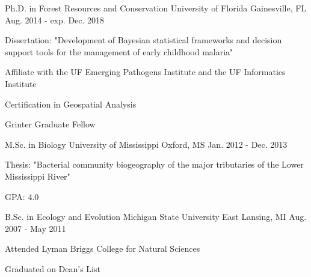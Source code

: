 

\begin{cventries}

  \cventry
    {Ph.D. in Forest Resources and Conservation} %
    {University of Florida} %
    {Gainesville, FL} %
    {Aug. 2014 - exp. Dec. 2018} %
    {
      \begin{cvitems} %
        \item {Dissertation: "Development of Bayesian statistical frameworks and decision support tools for the management of early childhood malaria"}
        \item {Affiliate with the UF Emerging Pathogens Institute and the UF Informatics Institute}
        \item {Certification in Geospatial Analysis}
        \item {Grinter Graduate Fellow}
      \end{cvitems}
    }

  \cventry
    {M.Sc. in Biology} %
    {University of Mississippi} %
    {Oxford, MS} %
    {Jan. 2012 - Dec. 2013} %
    {
      \begin{cvitems} %
        \item {Thesis: "Bacterial community biogeography of the major tributaries of the Lower Mississippi River"}
        \item {GPA: 4.0}
      \end{cvitems}
    }

  \cventry
    {B.Sc. in Ecology and Evolution} %
    {Michigan State University} %
    {East Lansing, MI} %
    {Aug. 2007 - May 2011} %
    {
      \begin{cvitems} %
        \item {Attended Lyman Briggs College for Natural Sciences}
        \item {Graduated on Dean's List}
      \end{cvitems}
    }


\end{cventries}
